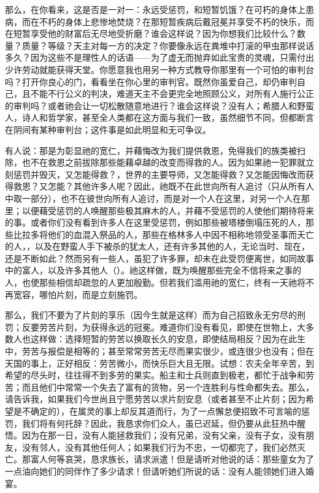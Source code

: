 那么，在你看来，这是否是一对一：永远受惩罚，和短暂饥饿？在可朽的身体上患病，而在不朽的身体上悲惨地焚烧？在那短暂疾病后戴冠冕并享受不朽的快乐，而在短暂享受他的财富后无尽地受折磨？谁会这样说？因为你想我们比较什么？数量？质量？等级？天主对每一方的决定？你要像永远在粪堆中打滚的甲虫那样说话多久？因为这些不是理性人的话语——为了虚无而抛弃如此宝贵的灵魂，只需付出少许劳动就能获得天堂。你愿意我也用另一种方式教导你那里有一个可怕的审判台吗？打开你良心的门，看看坐在你心里的审判官。既然你虽爱自己，却仍审判自己，且不能不行公义的判决，难道天主不会更完全地照顾公义，对所有人施行公正的审判吗？或者祂会让一切松散随意地进行？谁会这样说？没有人；希腊人和野蛮人，诗人和哲学家，甚至全人类都在这方面与我们一致，虽然细节不同，但都断言在阴间有某种审判台；这件事是如此明显和无可争议。\par

有人说：那是为彰显祂的宽仁，并藉悔改为我们提供救恩，免得我们的族类被扫除，也不在救恩之前拔除那些能藉卓越的改变而得救的人。因为如果祂一犯罪就立刻惩罚并毁灭，又怎能得救？，世界的主要导师，又怎能得救？又怎能因悔改而获得救恩？又怎能？其他许多人呢？因此，祂既不在此世向所有人追讨（只从所有人中取一部分），也不在彼世向所有人追讨，而是对一个人在这里，对另一个人在那里；以便藉受惩罚的人唤醒那些极其麻木的人，并藉不受惩罚的人使他们期待将来的事。或者你们没有看到许多人在这里受惩罚，例如那些被塔楼倒塌压死的人，那些比拉多将他们的血混入祭品的人，那些在格林多人中因不相称地领受圣事而夭亡的人，，以及在野蛮人手下被杀的犹太人，还有许多其他的人，无论当时、现在，还是不断如此？然而另有一些人，虽犯了许多罪，却未在此受罚便离世，如同故事中的富人，以及许多其他人（）。祂这样做，既为唤醒那些完全不信将来之事的人，也使那些相信却疏忽的人更加殷勤。但若我们滥用祂的宽仁，终有一天祂将不再宽容，哪怕片刻，而是立刻施罚。\par

那么，我们不要为了片刻的享乐（因今生就是这样）而为自己招致永无穷尽的刑罚；反要劳苦片刻，为获得永远的冠冕。难道你们没有看见，即使在世物上，大多数人也这样做：选择短暂的劳苦以换取长久的安息，即使结局相反？因为在此生中，劳苦与报偿是相等的；甚至常常劳苦无尽而果实很少，或连很少也没有；但在天国的事上，正好相反：劳苦微小，而快乐巨大且无限。试想：农夫全年辛苦，到希望的尽头时，往往得不到多劳的果实。船主和士兵则直到极老，都忙于战争和劳苦；而且他们中常常一个失去了富有的货物，另一个连胜利与性命都失去。那么，请告诉我，如果我们今世尚且宁愿劳苦以求片刻安息（或者甚至不止片刻；因为希望是不确定的），在属灵的事上却反其道而行，为了一点懈怠便招致不可言喻的惩罚，我们将有何托辞？因此，我恳求你们众人，虽已迟延，但仍要从此狂热中醒悟。因为在那一日，没有人能拯救我们；没有兄弟，没有父亲，没有子女，没有朋友，没有邻人，没有其他任何人；如果我们行为不忠，一切都完了，我们必然灭亡。那富人何等哀哭，恳求族长，请求派遣！但是请听对他说的话：那些童女为了一点油向她们的同伴作了多少请求！但请听她们所说的话：没有人能领她们进入婚宴。\par

